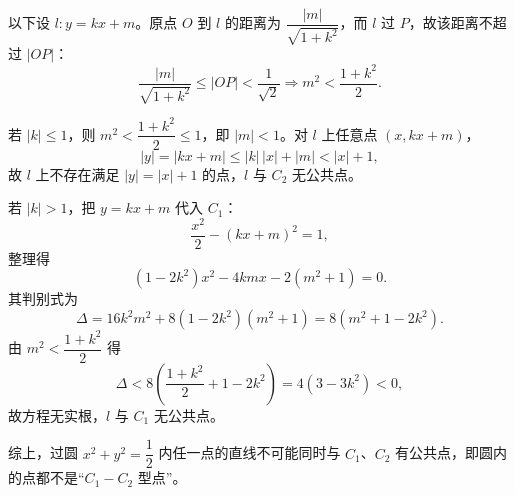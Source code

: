 \begin{answer}
以下设 $l:y=kx+m$。原点 $O$ 到 $l$ 的距离为 $\dfrac{|m|}{\sqrt{1+k^2}}$，而 $l$ 过 $P$，故该距离不超过 $|OP|$：
\nopagebreak[4]
\[\frac{|m|}{\sqrt{1+k^2}}\leqslant|OP|<\frac1{\sqrt2}\Longrightarrow m^2<\frac{1+k^2}2.\]

若 $|k|\leqslant1$，则 $m^2<\dfrac{1+k^2}2\leqslant1$，即 $|m|<1$。对 $l$ 上任意点 $(x,kx+m)$，
\nopagebreak[4]
\[|y|=|kx+m|\leqslant|k|\,|x|+|m|<|x|+1,\]
故 $l$ 上不存在满足 $|y|=|x|+1$ 的点，$l$ 与 $C_2$ 无公共点。

若 $|k|>1$，把 $y=kx+m$ 代入 $C_1$：
\nopagebreak[4]
\[\frac{x^2}2-(kx+m)^2=1,\]
整理得
\nopagebreak[4]
\[\left(1-2k^2\right)x^2-4kmx-2\left(m^2+1\right)=0.\]
其判别式为
\nopagebreak[4]
\[\Delta=16k^2m^2+8\left(1-2k^2\right)\left(m^2+1\right)=8\left(m^2+1-2k^2\right).\]
由 $m^2<\dfrac{1+k^2}2$ 得
\nopagebreak[4]
\[\Delta<8\left(\frac{1+k^2}2+1-2k^2\right)=4\left(3-3k^2\right)<0,\]
故方程无实根，$l$ 与 $C_1$ 无公共点。

综上，过圆 $x^2+y^2=\dfrac12$ 内任一点的直线不可能同时与 $C_1$、$C_2$ 有公共点，即圆内的点都不是“$C_1-C_2$ 型点”。




\end{answer}